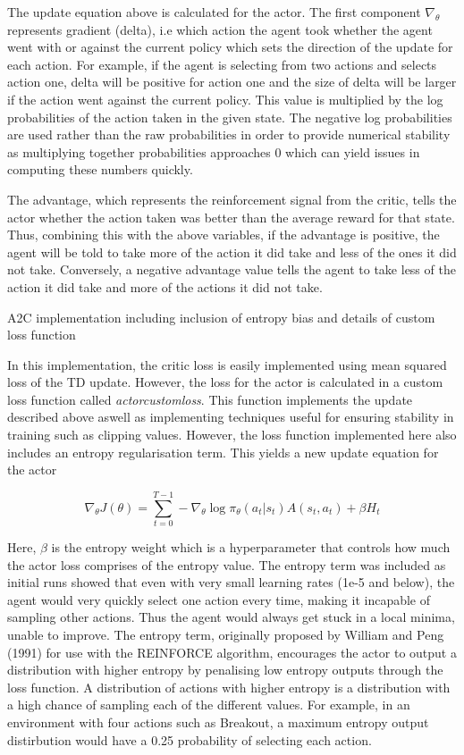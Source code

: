 \documentclass{article}
\begin{document}
The update equation above is calculated for the actor. The first component $\nabla_{\theta}$ represents gradient (delta), i.e which action the agent took whether the agent went with or against the current policy which sets the direction of the update for each action. For example, if the agent is selecting from two actions and selects action one, delta will be positive for action one and the size of delta will be larger if the action went against the current policy. This value is multiplied by the log probabilities of the action taken in the given state. The negative log probabilities are used rather than the raw probabilities in order to provide numerical stability as multiplying together probabilities approaches 0 which can yield issues in computing these numbers quickly.

The advantage, which represents the reinforcement signal from the critic, tells the actor whether the action taken was better than the average reward for that state. Thus, combining this with the above variables, if the advantage is positive, the agent will be told to take more of the action it did take and less of the ones it did not take. Conversely, a negative advantage value tells the agent to take less of the action it did take and more of the actions it did not take.

A2C implementation including inclusion of entropy bias and details of custom loss function

In this implementation, the critic loss is easily implemented using mean squared loss of the TD update. However, the loss for the actor is calculated in a custom loss function called \emph{actorcustomloss}. This function implements the update described above aswell as implementing techniques useful for ensuring stability in training such as clipping values. However, the loss function implemented here also includes an entropy regularisation term. This yields a new update equation for the actor


\begin{equation}
\nabla_{\theta} J(\theta) = \sum_{t=0}^{T-1}-\nabla_{\theta}\log{\pi_{\theta}}(a_{t} | s_{t}) A(s_{t}, a_{t}) + \beta H_{t}
\end{equation}

Here, $\beta$ is the entropy weight which is a hyperparameter that controls how much the actor loss comprises of the entropy value. The entropy term was included as initial runs showed that even with very small learning rates (1e-5 and below), the agent would very quickly select one action every time, making it incapable of sampling other actions. Thus the agent would always get stuck in a local minima, unable to improve. The entropy term, originally proposed by William and Peng (1991) for use with the REINFORCE algorithm, encourages the actor to output a distribution with higher entropy by penalising low entropy outputs through the loss function. A distribution of actions with higher entropy is a distribution with a high chance of sampling each of the different values. For example, in an environment with four actions such as Breakout, a maximum entropy output distirbution would have a 0.25 probability of selecting each action.
\end{document}
